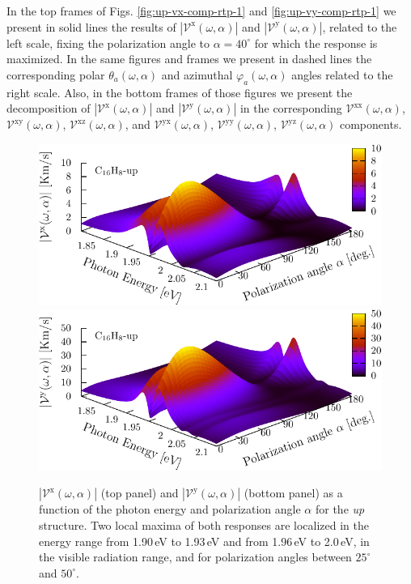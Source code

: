 \documentclass[prb,11pt,tightenlines,twocolumn,aps]{revtex4-1}
\begin{document}
In the top frames of  Figs. \ref{fig:up-vx-comp-rtp-1} and 
% 
\ref{fig:up-vy-comp-rtp-1} we present in solid lines the results of
$|\mathcal{V}^{\mathrm{x}}(\omega,\alpha)|$ and $|\mathcal{V}^{\mathrm{y}}(\omega,\alpha)|$,
related to the left scale, fixing the polarization angle to $\alpha=40^{\circ}$
for which the response is maximized. In the same
figures and frames we present in dashed lines the corresponding polar
$\theta_{a}(\omega,\alpha)$ and azimuthal $\varphi_{a}(\omega,\alpha)$ angles related to the
right scale. Also, in the bottom frames of those figures we present the
decomposition of $|\mathcal{V}^{\mathrm{x}}(\omega,\alpha)|$ and
$|\mathcal{V}^{\mathrm{y}}(\omega,\alpha)|$ in the corresponding
$\mathcal{V}^{\mathrm{xx}}(\omega,\alpha)$, $\mathcal{V}^{\mathrm{xy}}(\omega,\alpha)$,
$\mathcal{V}^{\mathrm{xz}}(\omega,\alpha)$, and $\mathcal{V}^{\mathrm{yx}}(\omega,\alpha)$,
$\mathcal{V}^{\mathrm{yy}}(\omega,\alpha)$, $\mathcal{V}^{\mathrm{yz}}(\omega,\alpha)$
components.
\begin{figure}[t]
    \centering
    \includegraphics[width=\linewidth]{upplots/up-3d-vxb-2}
    \label{fig:up-3d-vvx-2}
    \\
    \includegraphics[width=\linewidth]{upplots/up-3d-vyb-2}
    \label{fig:up-3d-vvy-2}
    
    \caption{$|\mathcal{V}^{\mathrm{x}}(\omega,\alpha)|$ (top panel) and
    $|\mathcal{V}^{\mathrm{y}}(\omega,\alpha)|$ (bottom panel)  as a function of
    the photon energy and polarization angle $\alpha$ for the \emph{up}
    structure. Two local maxima of both responses are localized in the energy
    range from 1.90\,eV to 1.93\,eV and from 1.96\,eV to 2.0\,eV, in the visible
    radiation range, and for polarization angles between $25^{\circ}$ and
    $50^{\circ}$.}
    \label{fig:up-3d-vva-2}
\end{figure}
\end{document}
